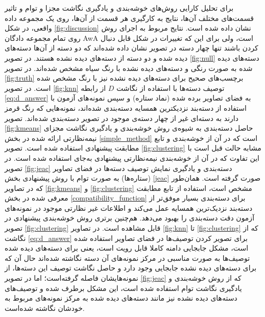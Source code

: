 برای تحلیل کارایی روش‌های خوشه‌بندی و یادگیری نگاشت مجزا و توام و تاثیر قسمت‌های مختلف آن‌ها، 
نتایج به کارگیری هر قسمت از آن‌ها،
  روی یک مجموعه داده واقعی، در شکل
\ref{fig:discussion}
 نشان داده شده است. نتایج مربوط به اجرای روش روی تمام مجموعه دادگان AwA است، ولی برای این که تغییرات در شکل قابل دنبال کردن باشند تنها چهار دسته در  تصویر نشان داده شده‌اند که دو دسته از آن‌ها دسته‌های دیده شده و دو دسته از دسته‌های دیده نشده هستند. در تصویر
\ref{fig:null}
دسته‌های دیده شده به صورت رنگی و دسته‌های دیده نشده با رنگ سیاه مشخص شده‌اند. در تصویر
\ref{fig:truth}
برچسب‌های صحیح برای دسته‌های دیده نشده نیز با رنگ مشخص شده است. در تصویر
\ref{fig:knn}
توصیف دسته‌ها با استفاده از نگاشت $D$ از رابطه \eqref{eq:d_answer} به فضای تصاویر برده شده (نماد ستاره) و سپس نمونه‌های آزمون با استفاده از دسته‌بند نزدیکترین همسایه دسته‌بندی شده‌اند، نمونه‌هایی که رنگ قرمز دارند به دسته‌ای غیر از چهار دسته‌ی موجود در تصویر دسته‌بندی شده‌اند. تصویر
\ref{fig:kmeans}
حاصل دسته‌بندی به شیوه‌ی روش خوشه‌بندی و یادگیری نگاشت مجزای نیمه‌نظارتی ارائه شده در بخش \ref{simple_method} است که در آن از خوشه‌بندی  و تابع مطابقت پیشنهادی استفاده شده است. تصویر
\ref{fig:clustering}
مشابه حالت قبل است با این تفاوت که در آن از خوشه‌بندی نیمه‌نظارتی پیشنهادی به‌جای  استفاده شده است. در تصویر
\ref{fig:jeac}
دسته‌بندی و یادگیری نمایش توصیف دسته‌ها در فضای تصاویر (ستاره‌ها) به صورت توام با روش پیشنهادی بخش \ref{jeac} صورت گرفته است.
همان‌طور که در تصاویر
\ref{fig:kmeans} و \ref{fig:clustering}
مشخص است، استفاده از  تابع مطابقت معرفی شده در بخش \ref{compatibility_function} برای دسته‌بندی بسیار موفق‌تر از دسته‌بند نزدیک‌ترین همسایه عمل می‌کند و اطلاعات غیر نظارتی موجود در نمونه‌های آزمون دقت  دسته‌بندی را بهبود می‌دهد. هم‌چنین برتری روش خوشه‌بندی پیشنهادی در تصویر \ref{fig:clustering} قابل مشاهده است. در تصاویر \ref{fig:knn} تا \ref{fig:clustering} که از نگاشت  \eqref{eq:d_answer} برای تصویر کردن توصیف‌ها در فضای تصاویر استفاده شده است، مشکل جابجایی دامنه کاملا قابل رویت است، یعنی برای دسته‌های دیده شده توصیف‌ها به صورت مناسبی در مرکز نمونه‌های آن دسته نگاشته شده‌اند حال آن که برای دسته‌های دیده نشده جابجایی وجود دارد و حاصل نگاشت توصیف این دسته‌ها،  از نمونه‌هایشان فاصله گرفته‌است؛ اما در تصویر
\ref{fig:jeac}
که از روش خوشه‌بندی و یادگیری نگاشت توام استفاده شده است، این مشکل برطرف شده و توصیف‌های دسته‌های دیده نشده نیز مانند دسته‌های دیده شده به مرکز نمونه‌های مربوط به خودشان نگاشته شده‌است.

